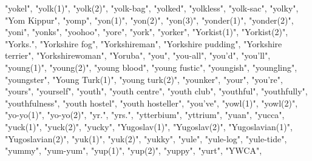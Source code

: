 "yokel",
"yolk(1)",
"yolk(2)",
"yolk-bag",
"yolked",
"yolkless",
"yolk-sac",
"yolky",
"Yom Kippur",
"yomp",
"yon(1)",
"yon(2)",
"yon(3)",
"yonder(1)",
"yonder(2)",
"yoni",
"yonks",
"yoohoo",
"yore",
"york",
"yorker",
"Yorkist(1)",
"Yorkist(2)",
"Yorks.",
"Yorkshire fog",
"Yorkshireman",
"Yorkshire pudding",
"Yorkshire terrier",
"Yorkshirewoman",
"Yoruba",
"you",
"you-all",
"you'd",
"you'll",
"young(1)",
"young(2)",
"young blood",
"young fustic",
"youngish",
"youngling",
"youngster",
"Young Turk(1)",
"young turk(2)",
"younker",
"your",
"you're",
"yours",
"yourself",
"youth",
"youth centre",
"youth club",
"youthful",
"youthfully",
"youthfulness",
"youth hostel",
"youth hosteller",
"you've",
"yowl(1)",
"yowl(2)",
"yo-yo(1)",
"yo-yo(2)",
"yr.",
"yrs.",
"ytterbium",
"yttrium",
"yuan",
"yucca",
"yuck(1)",
"yuck(2)",
"yucky",
"Yugoslav(1)",
"Yugoslav(2)",
"Yugoslavian(1)",
"Yugoslavian(2)",
"yuk(1)",
"yuk(2)",
"yukky",
"yule",
"yule-log",
"yule-tide",
"yummy",
"yum-yum",
"yup(1)",
"yup(2)",
"yuppy",
"yurt",
"YWCA",
